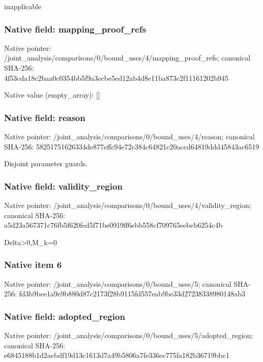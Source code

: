 \documentclass[10pt,a4paper]{article}
\begin{document}
\begingroup\raggedright\sloppy inapplicable\par\endgroup

\subsubsection{Native field: mapping\_\allowbreak{}proof\_\allowbreak{}refs}
Native pointer: /joint\_\allowbreak{}analysis/comparisons/0/bound\_\allowbreak{}uses/4/mapping\_\allowbreak{}proof\_\allowbreak{}refs; canonical SHA-256: 4f53cda18c2baa0c0354bb5f9a3ecbe5ed12ab4d8e11ba873c2f11161202b945

Native value (empty\_\allowbreak{}array): []

\subsubsection{Native field: reason}
Native pointer: /joint\_\allowbreak{}analysis/comparisons/0/bound\_\allowbreak{}uses/4/reason; canonical SHA-256: 58251751626334de877effc94e72c384c64821c20accd64819ddd45843ac6519

\begingroup\raggedright\sloppy Disjoint parameter guards.\par\endgroup

\subsubsection{Native field: validity\_\allowbreak{}region}
Native pointer: /joint\_\allowbreak{}analysis/comparisons/0/bound\_\allowbreak{}uses/4/validity\_\allowbreak{}region; canonical SHA-256: a5d23a567371c76fb5f620fed5f71be0919ff6ebb558cf709765eebeb6254c4b

\begingroup\raggedright\sloppy Delta>0,\allowbreak{}M\_\allowbreak{}k=\allowbreak{}0\par\endgroup

\subsubsection{Native item 6}
Native pointer: /joint\_\allowbreak{}analysis/comparisons/0/bound\_\allowbreak{}uses/5; canonical SHA-256: fd3b9bee1a9e9b880d87c2173f28b9115fd557eab9be33d27238338980148ab3

\subsubsection{Native field: adopted\_\allowbreak{}region}
Native pointer: /joint\_\allowbreak{}analysis/comparisons/0/bound\_\allowbreak{}uses/5/adopted\_\allowbreak{}region; canonical SHA-256: e6845188b1d2aebdf19d13c1613d7a49b5806a7fe336ec775fa182b36719bbc1
\end{document}

